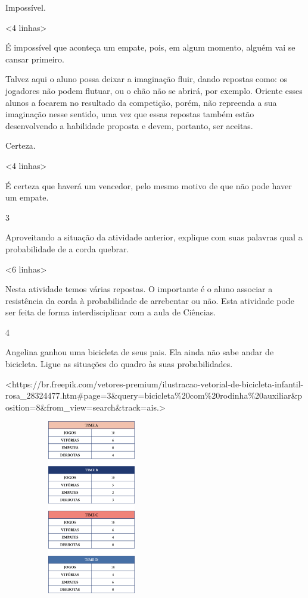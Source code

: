 {{{{{{{{{{{{{Impossível.

\textless{}4 linhas\textgreater{}

É impossível que aconteça um empate, pois, em algum momento, alguém vai se cansar primeiro.

Talvez aqui o aluno possa deixar a imaginação fluir,
dando repostas como: os jogadores não podem flutuar, ou o chão não se
abrirá, por exemplo. Oriente esses alunos a focarem no resultado
da competição, porém, não repreenda a sua imaginação nesse sentido, uma
vez que essas repostas também estão desenvolvendo a habilidade proposta e devem, portanto, ser aceitas.

Certeza.

\textless{}4 linhas\textgreater{}

É certeza que haverá um vencedor, pelo mesmo motivo de que não pode haver um empate.

\num{3}

Aproveitando a situação da atividade anterior, explique com suas
palavras qual a probabilidade de a corda quebrar.

\textless{}6 linhas\textgreater{}

Nesta atividade temos várias repostas. O importante é o
aluno associar a resistência da corda à probabilidade de arrebentar ou
não. Esta atividade pode ser feita de forma interdisciplinar com a aula
de Ciências.

\num{4}

Angelina ganhou uma bicicleta de seus pais. Ela ainda não sabe andar de
bicicleta. Ligue as situações do quadro às suas probabilidades.

\textless{}https://br.freepik.com/vetores-premium/ilustracao-vetorial-de-bicicleta-infantil-rosa\_28324477.htm\#page=3\&query=bicicleta\%20com\%20rodinha\%20auxiliar\&position=8\&from\_view=search\&track=ais.\textgreater{}

\includegraphics[width=3.01042in,height=3.01042in]{media/image85.png}

}}}}}}}}}}}}}
